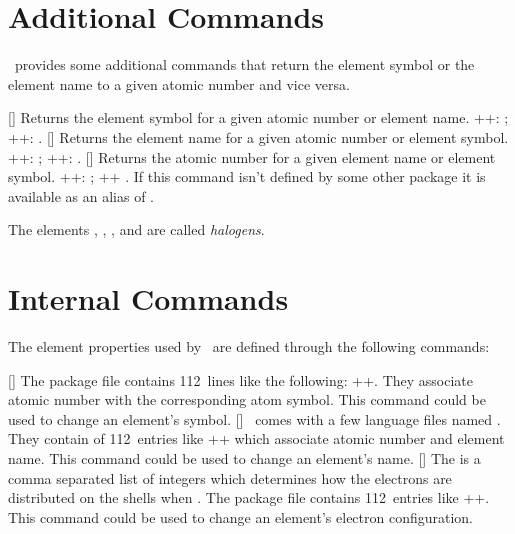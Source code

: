 \documentclass[load-preamble+]{cnltx-doc}
\begin{document}
\section{Additional Commands}\label{sec:additional-commands}
\BOHR\ provides some additional commands that return the element symbol or the
element name to a given atomic number and vice versa.
\begin{commands}
  []
    Returns the element symbol for a given atomic number or element name.
    \verbcode++: ;
    \verbcode++: .
  []
    Returns the element name for a given atomic number or element symbol.
    \verbcode++: ;
    \verbcode++: .
  []
    Returns the atomic number for a given element name or element symbol.
    \verbcode++: ;
    \verbcode++ .
    If this command isn't defined by some other package it is available as an
    alias of .
\end{commands}

\begin{example}
  The elements , , ,
   and  are called \emph{halogens}.
\end{example}

\section{Internal Commands}\label{sec:internal-commands}
The element properties used by \BOHR\ are defined through the following commands:
\begin{commands}
  []
    The package file contains 112~lines like the following:
    \verbcode++.  They associate atomic number with
    the corresponding atom symbol.  This command could be used to change an
    element's symbol.
  []
    \BOHR\ comes with a few language files named
    .  They contain of 112~entries
    like \verbcode++ which associate atomic number
    and element name.  This command could be used to change an element's name.
  []
    The  is a comma separated list of integers
    which determines how the electrons are distributed on the shells when
    .  The package file contains
    112~entries like \verbcode++.
    This command could be used to change an element's electron configuration.
\end{commands}
\end{document}
